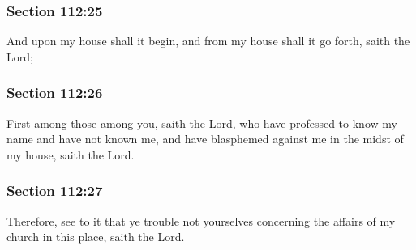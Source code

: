 	\subsubsection{Section 112:25} %
		\label{DC112-25}

		And upon my house shall it begin, and from my house shall it go forth, saith the Lord;


	\subsubsection{Section 112:26} %
		\label{DC112-26}

		First among those among you, saith the Lord, who have professed to know my name and have not known me, and have blasphemed against me in the midst of my house, saith the Lord.


	\subsubsection{Section 112:27} %
		\label{DC112-27}

		Therefore, see to it that ye trouble not yourselves concerning the affairs of my church in this place, saith the Lord.


